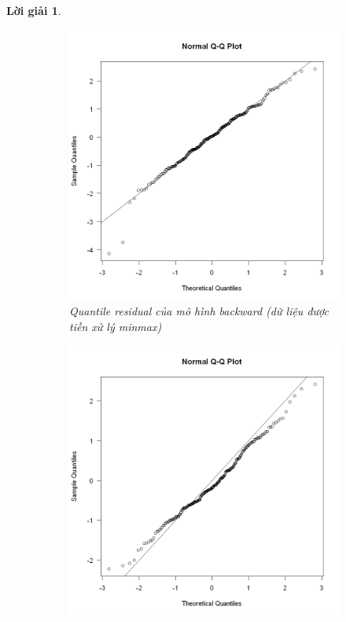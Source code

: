 \documentclass[14pt, a4paper]{article}
\theoremstyle{sltheorem}
\theoremstyle{soltheorem}
\newtheorem*{loigiai}{Lời giải}
\begin{document}
\begin{loigiai}
    \begin{figure}[h!]
        \centering
        \begin{subfigure}[b]{0.4\textwidth}
            \centering
            \includegraphics[width=\textwidth]{figures/minmax_mb_quantile_resid.png}
            \caption{Quantile residual của mô hình backward (dữ liệu được tiền xử lý minmax)}
        \end{subfigure}
        \hfill
        \begin{subfigure}[b]{0.4\textwidth}
            \centering
            \includegraphics[width=\textwidth]{figures/standardize_mb_quantile_resid.png}

\end{subfigure}
\end{figure}
\end{loigiai}
\end{document}
